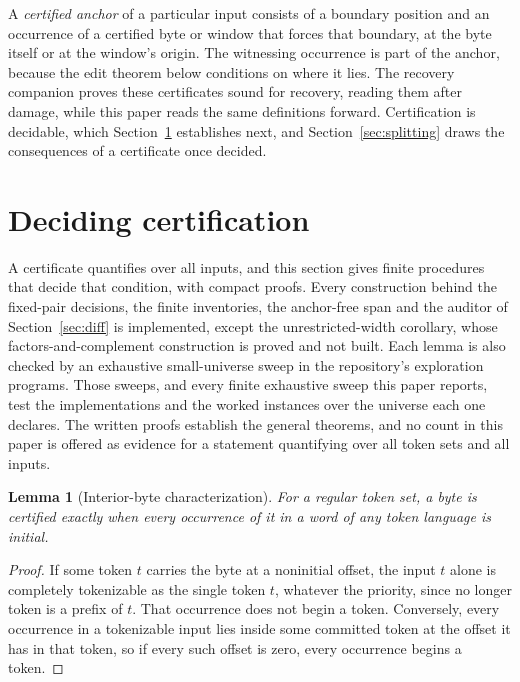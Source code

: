 \documentclass[11pt,a4paper]{article}
\theoremstyle{definition}
\theoremstyle{plain}
\newtheorem{lemma}{Lemma}
\begin{document}
A \emph{certified anchor} of a particular input consists of a boundary position and an occurrence of a certified byte or
window that forces that boundary, at the byte itself or at the window's origin. The witnessing occurrence is part of the
anchor, because the edit theorem below conditions on where it lies. The recovery companion proves these certificates
sound for recovery, reading them after damage, while this paper reads the same definitions forward. Certification is
decidable, which Section~\ref{sec:deciding} establishes next, and Section~\ref{sec:splitting} draws the consequences of
a certificate once decided.

\section{Deciding certification}\label{sec:deciding}

A certificate quantifies over all inputs, and this section gives finite procedures that decide that condition, with
compact proofs. Every construction behind the fixed-pair decisions, the finite inventories, the anchor-free span and the
auditor of Section~\ref{sec:diff} is implemented, except the unrestricted-width corollary, whose factors-and-complement
construction is proved and not built. Each lemma is also checked by an exhaustive small-universe sweep in the
repository's exploration programs. Those sweeps, and every finite exhaustive sweep this paper reports, test the
implementations and the worked instances over the universe each one declares. The written proofs establish the general
theorems, and no count in this paper is offered as evidence for a statement quantifying over all token sets and all
inputs.

\begin{lemma}[Interior-byte characterization]\label{lem:interior}
For a regular token set, a byte is certified exactly when every occurrence of it in a word of any token language is
initial.
\end{lemma}

\begin{proof}
If some token $t$ carries the byte at a noninitial offset, the input $t$ alone is completely tokenizable as the single
token $t$, whatever the priority, since no longer token is a prefix of $t$. That occurrence does not begin a token.
Conversely, every occurrence in a tokenizable input lies inside some committed token at the offset it has in that token,
so if every such offset is zero, every occurrence begins a token.
\end{proof}
\end{document}
